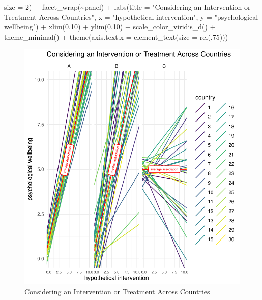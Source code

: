 \documentclass[
  letterpaper,
  DIV=11,
  numbers=noendperiod]{scrreprt}
\newenvironment{Shaded}{\begin{snugshade}}{\end{snugshade}}
\newcommand{\AttributeTok}[1]{\textcolor[rgb]{0.40,0.45,0.13}{#1}}
\newcommand{\DecValTok}[1]{\textcolor[rgb]{0.68,0.00,0.00}{#1}}
\newcommand{\FunctionTok}[1]{\textcolor[rgb]{0.28,0.35,0.67}{#1}}
\newcommand{\NormalTok}[1]{\textcolor[rgb]{0.00,0.23,0.31}{#1}}
\newcommand{\SpecialCharTok}[1]{\textcolor[rgb]{0.37,0.37,0.37}{#1}}
\newcommand{\StringTok}[1]{\textcolor[rgb]{0.13,0.47,0.30}{#1}}
\begin{document}
\begin{Shaded}
\begin{Highlighting}[]
                   \AttributeTok{size =} \DecValTok{2}\NormalTok{) }\SpecialCharTok{+}
  \FunctionTok{facet\_wrap}\NormalTok{(}\SpecialCharTok{\textasciitilde{}}\NormalTok{panel) }\SpecialCharTok{+}
  \FunctionTok{labs}\NormalTok{(}\AttributeTok{title =} \StringTok{"Considering an Intervention or Treatment Across Countries"}\NormalTok{,}
       \AttributeTok{x =} \StringTok{"hypothetical intervention"}\NormalTok{,}
       \AttributeTok{y =} \StringTok{"psychological wellbeing"}\NormalTok{) }\SpecialCharTok{+}
  \FunctionTok{xlim}\NormalTok{(}\DecValTok{0}\NormalTok{,}\DecValTok{10}\NormalTok{) }\SpecialCharTok{+}
  \FunctionTok{ylim}\NormalTok{(}\DecValTok{0}\NormalTok{,}\DecValTok{10}\NormalTok{) }\SpecialCharTok{+}
  \FunctionTok{scale\_color\_viridis\_d}\NormalTok{() }\SpecialCharTok{+}
  \FunctionTok{theme\_minimal}\NormalTok{() }\SpecialCharTok{+}
  \FunctionTok{theme}\NormalTok{(}\AttributeTok{axis.text.x =} \FunctionTok{element\_text}\NormalTok{(}\AttributeTok{size =} \FunctionTok{rel}\NormalTok{(.}\DecValTok{75}\NormalTok{)))}
\end{Highlighting}
\end{Shaded}

\begin{figure}[H]

{\centering \includegraphics{./intro_files/figure-pdf/fig-variation2-1.pdf}

}

\caption{\label{fig-variation2}Considering an Intervention or Treatment
Across Countries}

\end{figure}
\end{document}
